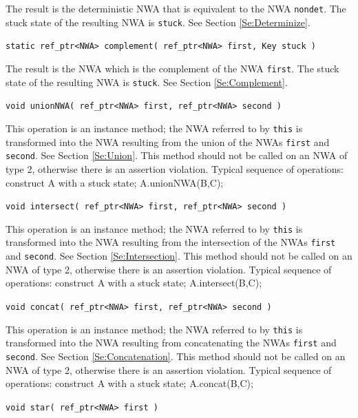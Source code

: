 \documentclass{llncs}
\begin{document}
\begin{description}
    The result is the deterministic NWA that is equivalent to the NWA
    \texttt{nondet}.  The stuck state of the resulting NWA is \texttt{stuck}.
    See Section \ref{Se:Determinize}.

  \item\texttt{static ref\_ptr<NWA> complement( ref\_ptr<NWA> first, Key stuck )} \nopagebreak

    The result is the NWA which is the complement of the NWA \texttt{first}.
    The stuck state of the resulting NWA is \texttt{stuck}.  See Section
    \ref{Se:Complement}.

  \item\texttt{void unionNWA( ref\_ptr<NWA> first, ref\_ptr<NWA> second )} \nopagebreak

    This operation is an instance method; the NWA referred to by
    \texttt{this} is transformed into the NWA resulting from the union of the
    NWAs \texttt{first} and \texttt{second}.  See Section \ref{Se:Union}.
    This method should not be called on an NWA of type 2, otherwise there is
    an assertion violation.  Typical sequence of operations: construct A with
    a stuck state; A.unionNWA(B,C);

 \item\texttt{void intersect( ref\_ptr<NWA> first, ref\_ptr<NWA> second )} \nopagebreak

    This operation is an instance method; the NWA referred to by
    \texttt{this} is transformed into the NWA resulting from the intersection
    of the NWAs \texttt{first} and \texttt{second}.  See Section
    \ref{Se:Intersection}.  This method should not be called on an NWA of
    type 2, otherwise there is an assertion violation.  Typical sequence of
    operations: construct A with a stuck state; A.intersect(B,C);

  \item\texttt{void concat( ref\_ptr<NWA> first, ref\_ptr<NWA> second )} \nopagebreak

    This operation is an instance method; the NWA referred to by
    \texttt{this} is transformed into the NWA resulting from concatenating
    the NWAs \texttt{first} and \texttt{second}.  See Section
    \ref{Se:Concatenation}.  This method should not be called on an NWA of
    type 2, otherwise there is an assertion violation.  Typical sequence of
    operations: construct A with a stuck state; A.concat(B,C);

  \item\texttt{void star( ref\_ptr<NWA> first )} \nopagebreak


\end{description}
\end{document}
